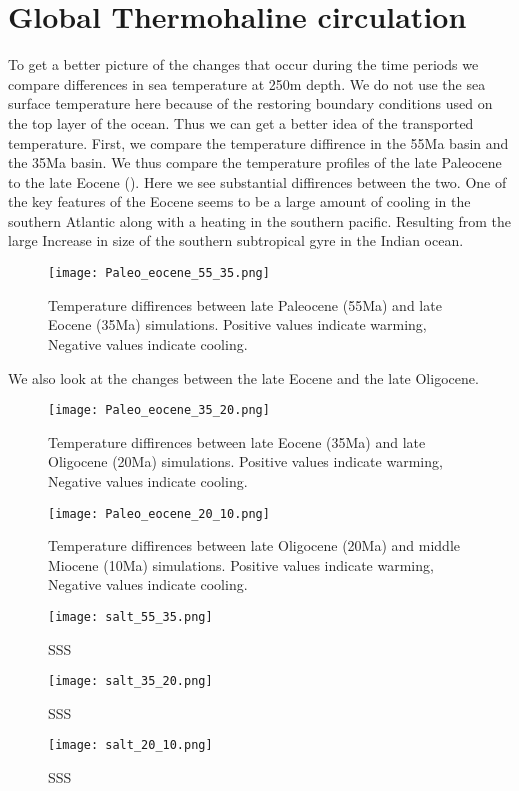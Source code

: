 \section{Global Thermohaline circulation}
To get a better picture of the changes that occur during the time periods we compare differences in sea temperature at 250m depth. We do not use the sea surface temperature here because of the restoring boundary conditions used on the top layer of the ocean. Thus we can get a better idea of the transported temperature. First, we compare the temperature diffirence in the 55Ma basin and the 35Ma basin. We thus compare the temperature profiles of the late Paleocene to the late Eocene (). Here we see substantial diffirences between the two. One of the key features of the Eocene seems to be a large amount of cooling in the southern Atlantic along with a heating in the southern pacific. Resulting from the large Increase in size of the southern subtropical gyre in the Indian ocean. 
\begin{figure}[H]
	\texttt{[image: Paleo\_eocene\_55\_35.png]}
	\caption{Temperature diffirences between late Paleocene (55Ma) and late Eocene (35Ma) simulations. Positive values indicate warming, Negative values indicate cooling.}
	\label{fig:5535cooling}
\end{figure}

We also look at the changes between the late Eocene and the late Oligocene. 

\begin{figure}[H]
	\texttt{[image: Paleo\_eocene\_35\_20.png]}
	\caption{Temperature diffirences between late Eocene (35Ma) and late Oligocene (20Ma) simulations. Positive values indicate warming, Negative values indicate cooling.}
	\label{fig:3520cooling}
\end{figure}

\begin{figure}[H]
	\texttt{[image: Paleo\_eocene\_20\_10.png]}
	\caption{Temperature diffirences between late Oligocene (20Ma) and middle Miocene (10Ma) simulations. Positive values indicate warming, Negative values indicate cooling.}
	\label{fig:2010cooling}
\end{figure}


\begin{figure}[H]
	\texttt{[image: salt\_55\_35.png]}
	\caption{SSS}
	\label{fig:salt5535cooling}
\end{figure}
\begin{figure}[H]
	\texttt{[image: salt\_35\_20.png]}
	\caption{SSS}
	\label{fig:salt3520cooling}
\end{figure}
\begin{figure}[H]
	\texttt{[image: salt\_20\_10.png]}
	\caption{SSS}
	\label{fig:salt2010cooling}
\end{figure}

